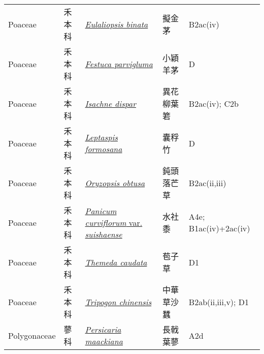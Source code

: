 {\begin{longtable}{L{2.5cm}L{2cm}L{5cm}L{2.5cm}L{3cm}}
    Poaceae & 禾本科 & \href{http://www.theplantlist.org/tpl1.1/search?q=Eulaliopsis+binata}{\textit{Eulaliopsis binata} } & 擬金茅 & B2ac(iv)    \\
    Poaceae & 禾本科 & \href{http://www.theplantlist.org/tpl1.1/search?q=Festuca+parvigluma}{\textit{Festuca parvigluma} } & 小穎羊茅 & D    \\
    Poaceae & 禾本科 & \href{http://www.theplantlist.org/tpl1.1/search?q=Isachne+dispar}{\textit{Isachne dispar} } & 異花柳葉箬 & B2ac(iv); C2b    \\
    Poaceae & 禾本科 & \href{http://www.theplantlist.org/tpl1.1/search?q=Leptaspis+formosana}{\textit{Leptaspis formosana} } & 囊稃竹 & D    \\
    Poaceae & 禾本科 & \href{http://www.theplantlist.org/tpl1.1/search?q=Oryzopsis+obtusa}{\textit{Oryzopsis obtusa} } & 鈍頭落芒草 & B2ac(ii,iii)    \\
    Poaceae & 禾本科 & \href{http://www.theplantlist.org/tpl1.1/search?q=Panicum+curviflorum+var.+suishaense}{\textit{Panicum curviflorum} var. \textit{suishaense} } & 水社黍 & A4e; B1ac(iv)+2ac(iv)    \\
    Poaceae & 禾本科 & \href{http://www.theplantlist.org/tpl1.1/search?q=Themeda+caudata}{\textit{Themeda caudata} } & 苞子草 & D1    \\
    Poaceae & 禾本科 & \href{http://www.theplantlist.org/tpl1.1/search?q=Tripogon+chinensis}{\textit{Tripogon chinensis} } & 中華草沙蠶 & B2ab(ii,iii,v); D1    \\
    Polygonaceae & 蓼科 & \href{http://www.theplantlist.org/tpl1.1/search?q=Persicaria+maackiana}{\textit{Persicaria maackiana} } & 長戟葉蓼 & A2d    \\

\end{longtable}}
